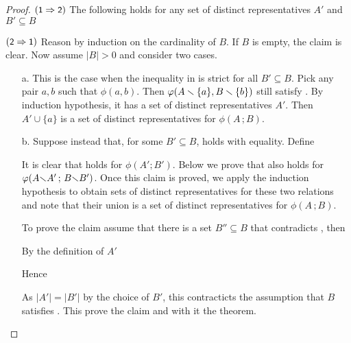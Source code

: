 \documentclass[scombinatorics.tex]{subfiles}
\begin{document}
\begin{proof}
   $(\textsf{\small 1}\Rightarrow\textsf{\small 2})$ 
   The following holds for any set of distinct representatives $A'$ and $B'\subseteq B$  



   $(\textsf{\small 2}\Rightarrow\textsf{\small 1})$ 
   Reason by induction on the cardinality of $B$.
   If $B$ is empty, the claim is clear.
   Now assume $|B|>0$ and consider two cases.

   \begin{itemize}
   \item[a.]
   This is the case when the inequality in  is strict for all $B'\subseteq B$. 
   Pick any pair $a,b$ such that $\phi(a,b)$. 
   Then $\varphi(A\smallsetminus\{a\}, B\smallsetminus\{b\})$ still satisfy .
   By induction hypothesis, it has a set of distinct representatives $A'$.
   Then $A'\cup\{a\}$ is a set of distinct representatives for $\phi(A\,;B)$.

   
   \item[b.]
   Suppose instead that, for some $B'\subseteq B$,  holds with equality.
   Define

   
   It is clear that  holds for $\phi(A';B')$.
   Below we prove that  also holds for $\varphi(A{\smallsetminus} A'\,;\,{B\smallsetminus} B')$.
   Once this claim is proved, we apply the induction hypothesis to obtain sets of distinct representatives for these two relations and note that their union is a set of distinct representatives for $\phi(A\,;B)$.

   To prove the claim assume that there is a set $B''\subseteq B$ that contradicts , then


   By the definition of $A'$



   Hence 


   As $|A'|=|B'|$ by the choice of $B'$, this contracticts the assumption that $B$ satisfies .
   This prove the claim and with it the theorem.
   \end{itemize}\vspace*{-4ex}
\end{proof}
\end{document}
